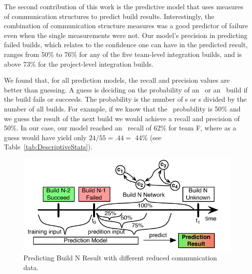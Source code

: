 The second contribution of this work is the predictive model that uses measures
of communication structures to predict build results. Interestingly, the
combination of communication structure measures was a good predictor of failure
even when the single measurements were not. Our model's precision in predicting
failed builds, which relates to the confidence one can have in the predicted
result, ranges from 50\% to 76\% for any of the five team-level integration
builds, and is above 73\% for the project-level integration builds.

We found that, for all prediction models, the recall and precision values are
better than guessing. A guess is deciding on the probability of an \error\ or an
\ok\ build if the build fails or succeeds. The probability is the number of
\error s or \ok s divided by the number of all builds. For example, if we know
that the \error\ probability is 50\% and we guess the result of the next build we
would achieve a recall and precision of 50\%. In our case, our model reached an
\error\ recall of 62\% for team F, where as a guess would have yield only
$24/55=.44=$ 44\% (see Table~\ref{tab:DescriptiveStats}).

\begin{figure}[t]
\begin{center}
\includegraphics[width=\columnwidth]{figures/ReducedCommunicationInput}
\caption{Predicting Build N Result with different reduced communication
data.}
\label{fig:ReducedCommunicationInput}
\end{center}
\end{figure}

